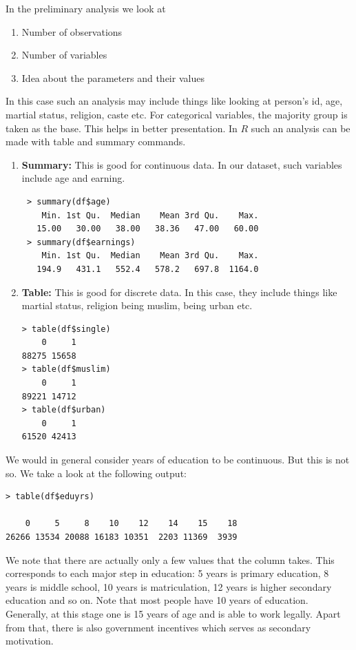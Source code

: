 \documentclass[notoc]{tufte-book}
\begin{document}
In the preliminary analysis we look at 
\begin{enumerate}
     \item Number of observations
     \item Number of variables
     \item Idea about the parameters and their values
\end{enumerate}
In this case such an analysis may include things like looking at person's id, age, martial status, religion, caste etc. For categorical variables, the majority group is taken as the base. This helps in better presentation.  In $R$ such an analysis can be made with table and summary commands.
\begin{enumerate}
    \item \textbf{Summary: }This is good for continuous data. In our dataset, such variables include age and earning. 
\begin{lstlisting}
 > summary(df$age)
    Min. 1st Qu.  Median    Mean 3rd Qu.    Max. 
   15.00   30.00   38.00   38.36   47.00   60.00 
 > summary(df$earnings)
    Min. 1st Qu.  Median    Mean 3rd Qu.    Max. 
   194.9   431.1   552.4   578.2   697.8  1164.0 
\end{lstlisting}
    \item \textbf{Table: }This is good for discrete data.  In this case, they include things like martial status, religion being muslim, being urban etc. 
\begin{lstlisting}
> table(df$single)
    0     1 
88275 15658 
> table(df$muslim)
    0     1 
89221 14712 
> table(df$urban)
    0     1 
61520 42413 
\end{lstlisting}
\end{enumerate}

We would in general consider years of education to be continuous. But this is not so. We take a look at the following output:
\begin{lstlisting}
> table(df$eduyrs)

    0     5     8    10    12    14    15    18 
26266 13534 20088 16183 10351  2203 11369  3939 
\end{lstlisting}
We note that there are actually only a few values that the column takes. This corresponds to each major step in education: 5 years is primary education,  8 years is middle school, 10 years is matriculation, 12 years is higher secondary education and so on. Note that most people have 10 years of education. Generally, at this stage one is 15 years of age and is able to work legally. Apart from that, there is also government incentives which serves as secondary motivation.
\end{document}
